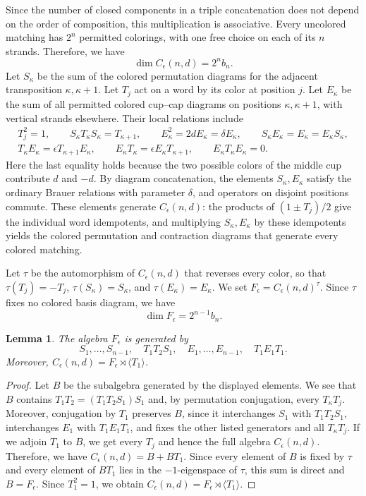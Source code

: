 \documentclass[11pt,a4paper]{amsart}
\newtheorem{lemma}[theorem]{Lemma}
\theoremstyle{uprightdefinition}
\theoremstyle{remark}\newtheorem{remark}[theorem]{Remark}
\begin{document}
Since the number of closed components
in a triple concatenation does not depend on the order of composition, this multiplication is associative.
Every uncolored matching has $2^n$ permitted colorings, with one free
choice on each of its $n$ strands. Therefore, we have
\[
 \dim C_\epsilon(n,d)=2^n b_n.
\]
Let $S_{\kappa}$ be the sum of the colored permutation diagrams for the adjacent
transposition $\kappa,\kappa+1$. Let $T_j$ act on a word by its color at position $j$.
Let $E_{\kappa}$ be the sum of all permitted colored cup--cap diagrams on positions
$\kappa,\kappa+1$, with vertical strands elsewhere. Their local relations include
\begin{gather*}
 T_j^2=1,\qquad S_{\kappa}T_{\kappa}S_{\kappa}=T_{\kappa+1},\qquad E_{\kappa}^2=2dE_{\kappa}=\delta E_{\kappa},
 \qquad S_{\kappa}E_{\kappa}=E_{\kappa}=E_{\kappa}S_{\kappa},\\
 T_{\kappa}E_{\kappa}=\epsilon T_{\kappa+1}E_{\kappa},\qquad
 E_{\kappa}T_{\kappa}=\epsilon E_{\kappa}T_{\kappa+1},\qquad E_{\kappa}T_{\kappa}E_{\kappa}=0.
\end{gather*}
Here the last equality holds because the two possible colors of the middle
cup contribute $d$ and $-d$. By diagram concatenation, the elements $S_{\kappa},E_{\kappa}$ satisfy the ordinary Brauer
relations with parameter $\delta$, and operators on disjoint
positions commute.
These elements generate $C_\epsilon(n,d)$: the products of
$(1\pm T_j)/2$ give the individual word idempotents, and multiplying
$S_{\kappa},E_{\kappa}$ by these idempotents yields the colored permutation and contraction
diagrams that generate every colored matching.

Let $\tau$ be the automorphism of $C_\epsilon(n,d)$ that reverses every color, so that
$\tau(T_j)=-T_j$, $\tau(S_{\kappa})=S_{\kappa}$, and $\tau(E_{\kappa})=E_{\kappa}$. We set
$F_\epsilon=C_\epsilon(n,d)^\tau$. Since $\tau$ fixes no
colored basis diagram, we have
\[
 \dim F_\epsilon=2^{n-1}b_n.
\]

\begin{lemma}\label{lem:D-colored-generators}
The algebra $F_\epsilon$ is generated by
\[
 S_1,\ldots,S_{n-1},\quad T_1T_2S_1,\quad
 E_1,\ldots,E_{n-1},\quad T_1E_1T_1.
\]
Moreover, $C_\epsilon(n,d)=F_\epsilon\rtimes\langle T_1\rangle$.
\end{lemma}
\begin{proof}
Let $B$ be the subalgebra generated by the displayed elements. We see that $B$ contains
$T_1T_2=(T_1T_2S_1)S_1$ and, by permutation conjugation, every $T_{\kappa}T_j$.
Moreover, conjugation by $T_1$ preserves $B$, since it interchanges $S_1$ with
$T_1T_2S_1$, interchanges $E_1$ with $T_1E_1T_1$, and fixes the other
listed generators and all $T_{\kappa}T_j$. If we adjoin $T_1$ to $B$, we get
every $T_j$ and hence the full algebra $C_\epsilon(n,d)$. Therefore, we have
$C_\epsilon(n,d)=B+BT_1$. Since every element of $B$ is fixed by $\tau$ and every
element of $BT_1$ lies in the $-1$-eigenspace of $\tau$, this sum is direct and
$B=F_\epsilon$. Since $T_1^2=1$, we obtain $C_\epsilon(n,d)=F_\epsilon\rtimes\langle T_1\rangle$.
\end{proof}
\end{document}
